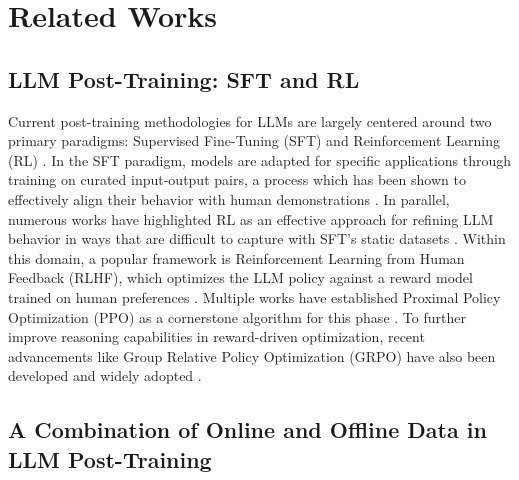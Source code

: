 \documentclass{article} %
\newcommand{\0}{\mathbb{0}}
\newcommand{\1}{\mathbb{1}}
\begin{document}




\section{Related Works}

\subsection{LLM Post-Training: SFT and RL}

Current post-training methodologies for LLMs are largely centered around two primary paradigms: Supervised Fine-Tuning (SFT) and Reinforcement Learning (RL) \citep{wei2021finetuned, ouyang2022training}. In the SFT paradigm, models are adapted for specific applications through training on curated input-output pairs, a process which has been shown to effectively align their behavior with human demonstrations \citep{chung2022scaling, longpre2023flan,touvron2023llama, touvron2023llama2}. 
In parallel, numerous works have highlighted RL as an effective approach for refining LLM behavior in ways that are difficult to capture with SFT's static datasets \citep{glaese2022improving, bai2022training, nakano2021webgpt}. Within this domain, a popular framework is Reinforcement Learning from Human Feedback (RLHF), which optimizes the LLM policy against a reward model trained on human preferences \citep{christiano2017deep, stiennon2020learning}. Multiple works have established Proximal Policy Optimization (PPO) as a cornerstone algorithm for this phase \citep{schulman2017proximal, ziegler2019fine}. To further improve reasoning capabilities in reward-driven optimization, recent advancements like Group Relative Policy Optimization (GRPO) have also been developed and widely adopted \citep{shao2024deepseekmath, zheng2025group, chen2025minimax}.


\subsection{A Combination of Online and Offline Data in LLM Post-Training}
\end{document}
